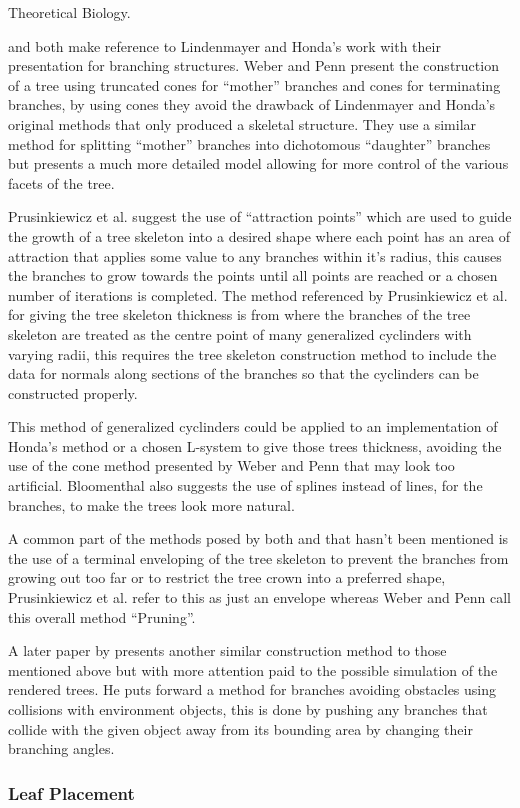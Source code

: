 \documentclass[review]{cmpreport}
\begin{document}
Theoretical Biology. \par
\cite{weber1995rendering} and \cite{runions2007colonization} both make reference to 
Lindenmayer and Honda's work with their presentation for branching structures. 
Weber and Penn present the construction of a tree using truncated cones for ``mother'' 
branches and cones for terminating branches, by using cones they avoid the drawback 
of Lindenmayer and Honda's original methods that only produced a skeletal structure. 
They use a similar method for splitting ``mother'' branches into dichotomous 
``daughter'' branches but presents a much more detailed model allowing for more 
control of the various facets of the tree. \par
Prusinkiewicz et al. suggest the use of ``attraction points'' which are used to 
guide the growth of a tree skeleton into a desired shape where each point has an 
area of attraction that applies some value to any branches within it's radius, this 
causes the branches to grow towards the points until all points are reached or a 
chosen number of iterations is completed. The method referenced by Prusinkiewicz 
et al. for giving the tree skeleton thickness is from \cite{bloomenthal1985modeling} 
where the branches of the tree skeleton are treated as the centre point of many 
generalized cyclinders with varying radii, this requires the tree skeleton construction 
method to include the data for normals along sections of the branches so that the 
cyclinders can be constructed properly. \par
This method of generalized cyclinders could be applied to an implementation of Honda's 
method or a chosen L-system to give those trees thickness, avoiding the use of the 
cone method presented by Weber and Penn that may look too artificial. Bloomenthal 
also suggests the use of splines instead of lines, for the branches, to make the trees 
look more natural. \par
A common part of the methods posed by both \cite{weber1995rendering} and 
\cite{runions2007colonization} that hasn't been mentioned is the use of a terminal 
enveloping of the tree skeleton to prevent the branches from growing out too far or to 
restrict the tree crown into a preferred shape, Prusinkiewicz et al. refer to this as 
just an envelope whereas Weber and Penn call this overall method ``Pruning''. \par
A later paper by \cite{weber2008simulation} presents another similar construction method 
to those mentioned above but with more attention paid to the possible simulation of the 
rendered trees. He puts forward a method for branches avoiding obstacles using collisions 
with environment objects, this is done by pushing any branches that collide with the given 
object away from its bounding area by changing their branching angles.

\subsubsection{Leaf Placement}


\clearpage

\end{document}
